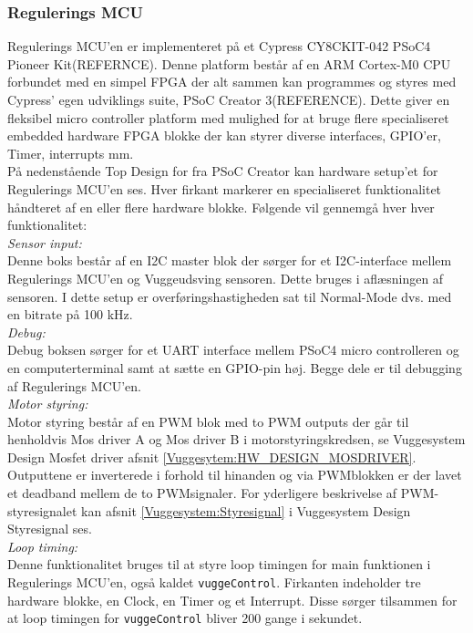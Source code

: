 \subsubsection{Regulerings MCU}
Regulerings MCU'en er implementeret på et Cypress CY8CKIT-042 PSoC4 Pioneer Kit(REFERNCE). Denne platform består af en ARM Cortex-M0 CPU forbundet med en simpel FPGA der alt sammen kan programmes og styres med Cypress' egen udviklings suite, PSoC Creator 3(REFERENCE). Dette giver en fleksibel micro controller platform med mulighed for at bruge flere specialiseret embedded hardware FPGA blokke der kan styrer diverse interfaces, GPIO'er, Timer, interrupts mm. \\
På nedenstående Top Design for fra PSoC Creator kan hardware setup'et for Regulerings MCU'en ses. Hver firkant markerer en specialiseret funktionalitet håndteret af en eller flere hardware blokke.
Følgende vil gennemgå hver hver funktionalitet: \\
\textit{Sensor input:} \\ Denne boks består af en I2C master blok der sørger for et I2C-interface mellem Regulerings MCU'en og Vuggeudsving sensoren. Dette bruges i aflæsningen af sensoren. I dette setup er overføringshastigheden sat til Normal-Mode dvs. med en bitrate på 100 kHz. \\
\textit{Debug:} \\ Debug boksen sørger for et UART interface mellem PSoC4 micro controlleren og en computerterminal samt at sætte en GPIO-pin høj. Begge dele er til debugging af Regulerings MCU'en. \\
\textit{Motor styring:} \\ Motor styring består af en PWM blok med to PWM outputs der går til henholdvis Mos driver A og Mos driver B i motorstyringskredsen, se Vuggesystem Design Mosfet driver afsnit \vref{Vuggesytem:HW_DESIGN_MOSDRIVER}. Outputtene er inverterede i forhold til hinanden og via PWMblokken er der lavet et deadband mellem de to PWMsignaler. For yderligere beskrivelse af PWM-styresignalet kan afsnit \vref{Vuggesystem:Styresignal} i Vuggesystem Design Styresignal ses. \\
\textit{Loop timing:} \\ Denne funktionalitet bruges til at styre loop timingen for main funktionen i Regulerings MCU'en, også kaldet \verb+vuggeControl+. Firkanten indeholder tre hardware blokke, en Clock, en Timer og et Interrupt. Disse sørger tilsammen for at loop timingen for \verb+vuggeControl+ bliver 200 gange i sekundet. \\  

